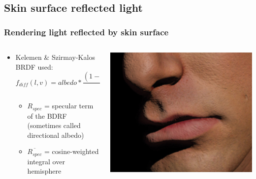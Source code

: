\documentclass{f4_beamer_metropolis}
\begin{document}
\subsection{Skin surface reflected light}

\begin{frame}[t]
  \frametitle{Rendering light reflected by skin surface}

  \begin{columns}[onlytextwidth,T]
    \begin{column}{.7\linewidth}
      \begin{itemize}
        \item Kelemen \& Szirmay-Kalos BRDF used: $$f_{diff}(l, v) = albedo * \frac{(1 - R_{spec}(l))* (1 - R_{spec}(v))}{\pi * (1 - \overline{R_{spec}})}$$
        \begin{itemize}
          \item $R_{spec}$ = specular term of the BDRF (sometimes called directional albedo)
          \item $\overline{R_{spec}}$ = cosine-weighted integral over hemisphere
        \end{itemize}
      \end{itemize}
    \end{column}
    \begin{column}{.3\linewidth}
      \includegraphics[scale=0.2,keepaspectratio]{./images/skin-rendering-without-sss.jpg}
    \end{column}
  \end{columns}


\end{frame}
\end{document}
